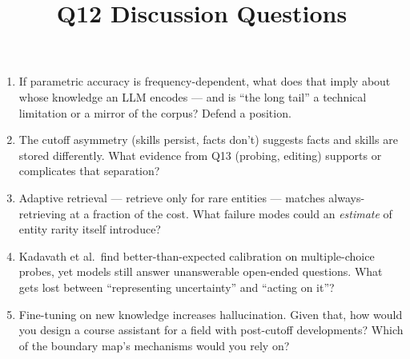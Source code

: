 \documentclass[11pt]{article}
\title{Q12 Discussion Questions}
\date{}
\begin{document}
\maketitle
\begin{enumerate}[noitemsep]
\item If parametric accuracy is frequency-dependent, what does that imply about whose knowledge an LLM encodes --- and is ``the long tail'' a technical limitation or a mirror of the corpus? Defend a position.
\item The cutoff asymmetry (skills persist, facts don't) suggests facts and skills are stored differently. What evidence from Q13 (probing, editing) supports or complicates that separation?
\item Adaptive retrieval --- retrieve only for rare entities --- matches always-retrieving at a fraction of the cost. What failure modes could an \emph{estimate} of entity rarity itself introduce?
\item Kadavath et al.\ find better-than-expected calibration on multiple-choice probes, yet models still answer unanswerable open-ended questions. What gets lost between ``representing uncertainty'' and ``acting on it''?
\item Fine-tuning on new knowledge increases hallucination. Given that, how would you design a course assistant for a field with post-cutoff developments? Which of the boundary map's mechanisms would you rely on?
\end{enumerate}
\end{document}
